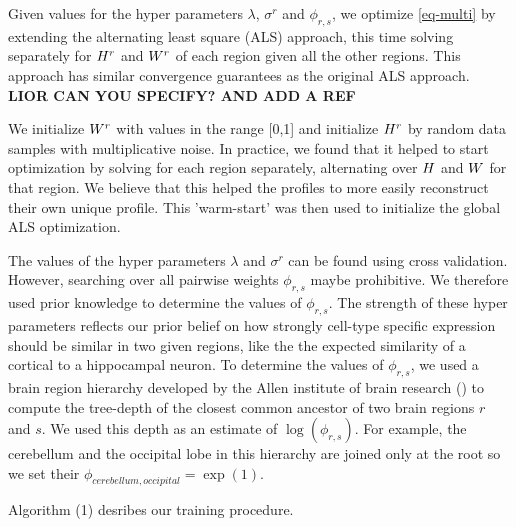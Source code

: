Given values for the hyper parameters $\lambda$, $\sigma^r$ and $\phi_{r,s}$, 
we optimize \eqref{eq-multi} by extending the alternating least square (ALS) approach, this time solving separately for ${{H}^r}$ and ${W^r}$ of each region given all the other regions. This approach has similar convergence guarantees as the original ALS approach.  {\bf{ LIOR CAN YOU SPECIFY? AND ADD A REF}}

We initialize $W^r$ with values in the range [0,1] and initialize ${H}^r$ by random data samples with multiplicative noise. In practice, we found that it helped to start optimization by solving for each region separately, alternating over ${H}$ and $W$ for that region. We believe that this helped the profiles to more easily reconstruct their own unique profile. This 'warm-start' was then used to initialize the global ALS optimization. 

The values of the hyper parameters $\lambda$ and $\sigma^r$ can be found using cross validation. However, searching over all pairwise weights $\phi_{r,s}$ maybe prohibitive. We therefore used prior knowledge to determine the values of $\phi_{r,s}$. The strength of these hyper parameters reflects our prior belief on how strongly cell-type specific expression should be similar in two given regions, like the the expected similarity of a cortical to a hippocampal neuron.
To determine the values of $\phi_{r,s}$, we used a brain region hierarchy developed by the Allen institute of brain research () to compute the tree-depth of the closest common ancestor of two brain regions $r$ and $s$. We used this depth as an estimate of $\log(\phi_{r,s})$. For example, the cerebellum and the occipital lobe  in this hierarchy are joined only at the root so we set their $\phi_{cerebellum, occipital} = \exp(1)$. 

Algorithm (1) desribes our training procedure.

